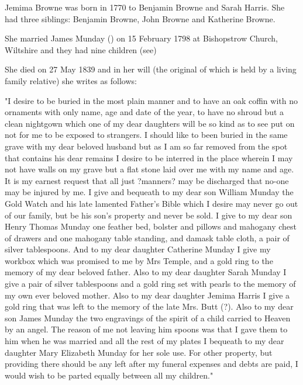 
Jemima Browne was born in	1770 to Benjamin Browne and Sarah Harris. She had three siblings: Benjamin Browne, John Browne and Katherine Browne.

She married James Munday () on 15 February 1798 at Bishopstrow Church, Wiltshire and they had nine children (see)

She died on 27 May 1839 and in her will (the original of which is held by a living family relative) she writes as follows:

"I desire to be buried in the most plain manner and to have an oak coffin with no ornaments with only name, age and date of the year, to have no shroud but a clean nightgown which one of my dear daughters will be so kind as to see put on not for me to be exposed to strangers. I should like to been buried in the same grave with my dear beloved husband but as I am so far removed from the spot that contains his dear remains I desire to be interred in the place wherein I may not have walls on my grave but a flat stone laid over me with my name and age. It is my earnest request that all just ?manners? may be discharged that no-one may be injured by me. I give and bequeath to my dear son William Munday the Gold Watch and his late lamented Father's Bible which I desire may never go out of our family, but be his son's property and never be sold. I give to my dear son Henry Thomas Munday one feather bed, bolster and pillows and mahogany chest of drawers and one mahogany table standing, and damask table cloth, a pair of silver tablespoons. And to my dear daughter Catherine Munday I give my workbox which was promised to me by Mrs Temple, and a gold ring to the memory of my dear beloved father. Also to my dear daughter Sarah Munday I give a pair of silver tablespoons and a gold ring set with pearls to the memory of my own ever beloved mother. Also to my dear daughter Jemima Harris I give a gold ring that was left to the memory of the late Mrs. Butt (?). Also to my dear son James Munday the two engravings of the spirit of a child carried to Heaven by an angel. The reason of me not leaving him spoons was that I gave them to him when he was married and all the rest of my plates I bequeath to my dear daughter Mary Elizabeth Munday for her sole use. For other property, but providing there should be any left after my funeral expenses and debts are paid, I would wish to be parted equally between all my children."
